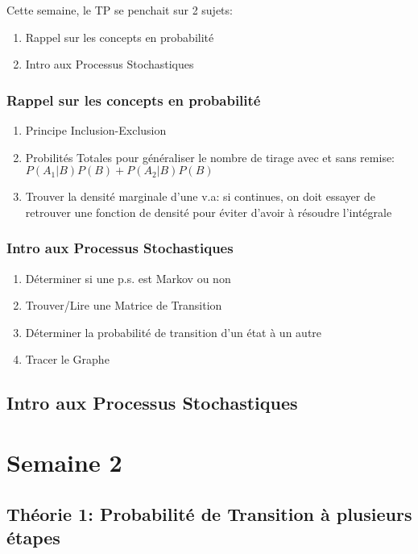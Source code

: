 \documentclass{article}
\begin{document}
Cette semaine, le TP se penchait sur 2 sujets:
\begin{enumerate}
    \item Rappel sur les concepts en probabilité
    \item Intro aux Processus Stochastiques
\end{enumerate}

\subsubsection{{Rappel sur les concepts en probabilité}}

\begin{enumerate}
    \item Principe Inclusion-Exclusion
    \item Probilités Totales pour généraliser le nombre de tirage avec et sans
	remise: $ P(A_1|B) P(B) + P(A_2|B)P(B) $
    \item Trouver la densité marginale d'une v.a: si continues, on doit essayer
	de retrouver une fonction de densité pour éviter d'avoir à résoudre
	l'intégrale
\end{enumerate}

\subsubsection{Intro aux Processus Stochastiques}

\begin{enumerate}
    \item Déterminer si une p.s. est Markov ou non
    \item Trouver/Lire une Matrice de Transition
    \item Déterminer la probabilité de transition d'un état à un autre
    \item Tracer le Graphe
\end{enumerate}

\subsection{Intro aux Processus Stochastiques}

\pagebreak

\section{Semaine 2}
\subsection{Théorie 1: Probabilité de Transition à plusieurs étapes}
\end{document}
